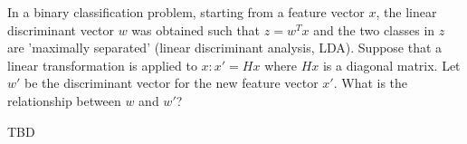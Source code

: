 \Exercise[number={15}]
In a binary classification problem, starting from a feature vector \(x\),
the linear discriminant vector \(w\) was obtained such that \(z=w^Tx\)
and the two classes in \(z\) are 'maximally separated' (linear
discriminant analysis, LDA). Suppose that a linear transformation is
applied to \(x: x'=Hx\) where \( H x\) is a diagonal matrix. Let \(w'\) be 
the discriminant vector for the new feature vector \(x'\).
What is the relationship between \(w\) and \(w'\)?

\Answer[number={15}]
TBD